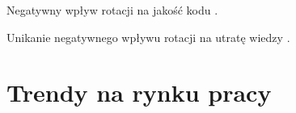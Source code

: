 Negatywny wpływ rotacji na jakość kodu \cite{donadelli-2015}.

Unikanie negatywnego wpływu rotacji na utratę wiedzy \cite{rigby-2016}.


%
%

\section{Trendy na rynku pracy}
\thispagestyle{normal}
